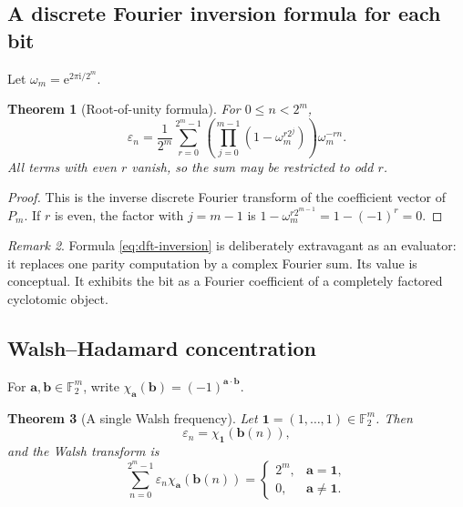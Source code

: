 \documentclass[11pt,oneside]{article}
\newtheorem{theorem}{Theorem}[section]
\theoremstyle{definition}
\theoremstyle{remark}
\newtheorem{remark}[theorem]{Remark}
\newcommand{\F}{\mathbb F}
\newcommand{\e}{\mathrm e}
\newcommand{\ii}{\mathrm i}
\newcommand{\eps}{\varepsilon}
\newcommand{\1}{\mathbf 1}
\begin{document}
\subsection{A discrete Fourier inversion formula for each bit}

Let \(\omega_m=\e^{2\pi\ii/2^m}\).

\begin{theorem}[Root-of-unity formula]
\label{thm:dft}
For \(0\le n<2^m\),
\begin{equation}
 \boxed{
 \eps_n=\frac1{2^m}
 \sum_{r=0}^{2^m-1}
 \left(\prod_{j=0}^{m-1}(1-\omega_m^{r2^j})\right)
 \omega_m^{-rn}.}
 \label{eq:dft-inversion}
\end{equation}
All terms with even \(r\) vanish, so the sum may be restricted to odd \(r\).
\end{theorem}

\begin{proof}
This is the inverse discrete Fourier transform of the coefficient vector of \(P_m\).  If
\(r\) is even, the factor with \(j=m-1\) is
\(1-\omega_m^{r2^{m-1}}=1-(-1)^r=0\).
\end{proof}

\begin{remark}
Formula \eqref{eq:dft-inversion} is deliberately extravagant as an evaluator: it replaces one
parity computation by a complex Fourier sum.  Its value is conceptual.  It exhibits the bit
as a Fourier coefficient of a completely factored cyclotomic object.
\end{remark}

\subsection{Walsh--Hadamard concentration}

For \(\bm a,\bm b\in\F_2^m\), write
\(\chi_{\bm a}(\bm b)=(-1)^{\bm a\cdot\bm b}\).

\begin{theorem}[A single Walsh frequency]
\label{thm:walsh}
Let \(\bm1=(1,\ldots,1)\in\F_2^m\).  Then
\begin{equation}
 \eps_n=\chi_{\bm1}(\bm b(n)),
 \label{eq:walsh-character}
\end{equation}
and the Walsh transform is
\begin{equation}
 \sum_{n=0}^{2^m-1}\eps_n\chi_{\bm a}(\bm b(n))
 =\begin{cases}
   2^m,&\bm a=\bm1,\\
   0,&\bm a\ne\bm1.
  \end{cases}
 \label{eq:walsh-transform}
\end{equation}
\end{theorem}
\end{document}
